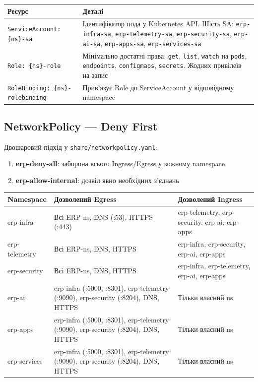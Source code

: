 \documentclass[12pt,a4paper]{article}
\begin{document}
\begin{longtable}{L{6.5cm} L{8.5cm}}
\toprule
{}
\color{primary}\textbf{Ресурс} & \color{primary}\textbf{Деталі} \\
\midrule\endhead\bottomrule\endfoot
\texttt{ServiceAccount: \{ns\}-sa}
  & Ідентифікатор пода у Kubernetes API. Шість SA:
    \texttt{erp-infra-sa}, \texttt{erp-telemetry-sa}, \texttt{erp-security-sa},
    \texttt{erp-ai-sa}, \texttt{erp-apps-sa}, \texttt{erp-services-sa} \\[4pt]
\texttt{Role: \{ns\}-role}
  & Мінімально достатні права: \texttt{get}, \texttt{list}, \texttt{watch}
    на \texttt{pods}, \texttt{endpoints}, \texttt{configmaps}, \texttt{secrets}.
    Жодних привілеїв на запис \\[4pt]
\texttt{RoleBinding: \{ns\}-rolebinding}
  & Прив'язує Role до ServiceAccount у відповідному namespace \\[4pt]
\end{longtable}

\subsection{NetworkPolicy --- Deny First}

Двошаровий підхід у \texttt{share/networkpolicy.yaml}:
\begin{enumerate}[leftmargin=1.5cm]
  \item \textbf{erp-deny-all}: заборона всього Ingress/Egress у кожному namespace
  \item \textbf{erp-allow-internal}: дозвіл явно необхідних з'єднань
\end{enumerate}

\begin{longtable}{L{3cm} L{5.5cm} L{5.5cm}}
\toprule
{}
\color{primary}\textbf{Namespace} &
\color{primary}\textbf{Дозволений Egress} &
\color{primary}\textbf{Дозволений Ingress} \\
\midrule\endhead\bottomrule\endfoot
erp-infra    & Всі ERP-ns, DNS (:53), HTTPS (:443) & erp-telemetry, erp-security, erp-ai, erp-apps \\[2pt]
erp-telemetry & Всі ERP-ns, DNS, HTTPS & erp-infra, erp-security, erp-ai, erp-apps \\[2pt]
erp-security & Всі ERP-ns, DNS, HTTPS & erp-infra, erp-telemetry, erp-ai, erp-apps \\[2pt]
erp-ai & erp-infra (:5000, :8301), erp-telemetry (:9090), erp-security (:8204), DNS, HTTPS & Тільки власний ns \\[2pt]
erp-apps     & erp-infra (:5000, :8301), erp-telemetry (:9090), erp-security (:8204), DNS, HTTPS & Тільки власний ns \\[2pt]
erp-services & erp-infra (:5000, :8301), erp-telemetry (:9090), erp-security (:8204), DNS, HTTPS & Тільки власний ns \\[2pt]
\end{longtable}
\end{document}

